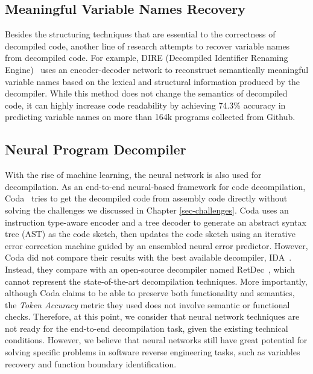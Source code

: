 \subsection{Meaningful Variable Names Recovery} \label{sec:existing-var-names}
Besides the structuring techniques that are essential to the correctness of decompiled code, another line of research attempts to recover variable names from decompiled code. For example, DIRE (Decompiled Identifier Renaming Engine)~\cite{lacomis2019dire} uses an encoder-decoder network to reconstruct semantically meaningful variable names based on the lexical and structural information produced by the decompiler. While this method does not change the semantics of decompiled code, it can highly increase code readability by achieving 74.3\% accuracy in predicting variable names on more than 164k programs collected from Github.

\subsection{Neural Program Decompiler} \label{sec:existing-neural-dec}
With the rise of machine learning, the neural network is also used for decompilation.  As an end-to-end neural-based framework for code decompilation, Coda~\cite{fu2019coda} tries to get the decompiled code from assembly code directly without solving the challenges we discussed in Chapter \ref{sec-challenges}. Coda uses an instruction type-aware encoder and a tree decoder to generate an abstract syntax tree (AST) as the code sketch, then updates the code sketch using an iterative error correction machine guided by an ensembled neural error predictor.
%
However, Coda did not compare their results with the best available decompiler, IDA~\cite{hex2014ida}. Instead, they compare with an open-source decompiler named RetDec~\cite{retdec}, which cannot represent the state-of-the-art decompilation techniques. More importantly, although Coda claims to be able to preserve both functionality and semantics, the \textit{Token Accuracy} metric they used does not involve semantic or functional checks. Therefore, at this point, we consider that neural network techniques are not ready for the end-to-end decompilation task, given the existing technical conditions. However, we believe that neural networks still have great potential for solving specific problems in software reverse engineering tasks, such as variables recovery and function boundary identification.

